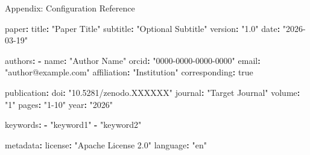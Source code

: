\documentclass[
  ignorenonframetext,
]{beamer}
\author{\texorpdfstring{}{}}
\date{}
\newenvironment{Shaded}{}{}
\newcommand{\AttributeTok}[1]{\textcolor[rgb]{0.49,0.56,0.16}{#1}}
\newcommand{\CharTok}[1]{\textcolor[rgb]{0.25,0.44,0.63}{#1}}
\newcommand{\FunctionTok}[1]{\textcolor[rgb]{0.02,0.16,0.49}{#1}}
\newcommand{\KeywordTok}[1]{\textcolor[rgb]{0.00,0.44,0.13}{\textbf{#1}}}
\newcommand{\StringTok}[1]{\textcolor[rgb]{0.25,0.44,0.63}{#1}}
\begin{document}
\begin{frame}
\newpage
\end{frame}

\begin{frame}{Appendix: Configuration
Reference}
\protect{}\label{appendix-config}
\begin{table}[h]
\caption{Configuration schema for \texttt{config.yaml}, showing all supported fields and their structure.}
\label{tab:config-reference}
\end{table}

\begin{Shaded}
\begin{Highlighting}[]
\FunctionTok{paper}\KeywordTok{:}
\AttributeTok{  }\FunctionTok{title}\KeywordTok{:}\AttributeTok{ }\StringTok{"Paper Title"}
\AttributeTok{  }\FunctionTok{subtitle}\KeywordTok{:}\AttributeTok{ }\StringTok{"Optional Subtitle"}
\AttributeTok{  }\FunctionTok{version}\KeywordTok{:}\AttributeTok{ }\StringTok{"1.0"}
\AttributeTok{  }\FunctionTok{date}\KeywordTok{:}\AttributeTok{ }\StringTok{"2026{-}03{-}19"}

\FunctionTok{authors}\KeywordTok{:}
\AttributeTok{  }\KeywordTok{{-}}\AttributeTok{ }\FunctionTok{name}\KeywordTok{:}\AttributeTok{ }\StringTok{"Author Name"}
\AttributeTok{    }\FunctionTok{orcid}\KeywordTok{:}\AttributeTok{ }\StringTok{"0000{-}0000{-}0000{-}0000"}
\AttributeTok{    }\FunctionTok{email}\KeywordTok{:}\AttributeTok{ }\StringTok{"author@example.com"}
\AttributeTok{    }\FunctionTok{affiliation}\KeywordTok{:}\AttributeTok{ }\StringTok{"Institution"}
\AttributeTok{    }\FunctionTok{corresponding}\KeywordTok{:}\AttributeTok{ }\CharTok{true}

\FunctionTok{publication}\KeywordTok{:}
\AttributeTok{  }\FunctionTok{doi}\KeywordTok{:}\AttributeTok{ }\StringTok{"10.5281/zenodo.XXXXXX"}
\AttributeTok{  }\FunctionTok{journal}\KeywordTok{:}\AttributeTok{ }\StringTok{"Target Journal"}
\AttributeTok{  }\FunctionTok{volume}\KeywordTok{:}\AttributeTok{ }\StringTok{"1"}
\AttributeTok{  }\FunctionTok{pages}\KeywordTok{:}\AttributeTok{ }\StringTok{"1{-}10"}
\AttributeTok{  }\FunctionTok{year}\KeywordTok{:}\AttributeTok{ }\StringTok{"2026"}

\FunctionTok{keywords}\KeywordTok{:}
\AttributeTok{  }\KeywordTok{{-}}\AttributeTok{ }\StringTok{"keyword1"}
\AttributeTok{  }\KeywordTok{{-}}\AttributeTok{ }\StringTok{"keyword2"}

\FunctionTok{metadata}\KeywordTok{:}
\AttributeTok{  }\FunctionTok{license}\KeywordTok{:}\AttributeTok{ }\StringTok{"Apache License 2.0"}
\AttributeTok{  }\FunctionTok{language}\KeywordTok{:}\AttributeTok{ }\StringTok{"en"}


\end{Highlighting}
\end{Shaded}
\end{frame}
\end{document}
